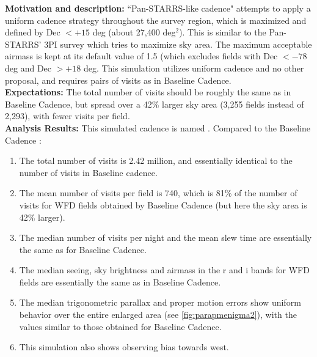 

{\bf Motivation and description:} ``Pan-STARRS-like cadence" attempts to apply a
uniform cadence strategy throughout the survey region, which is maximized and
defined by Dec $< +15$ deg (about 27,400 deg$^2$). This is similar to the Pan-
STARRS' 3PI survey which tries to maximize sky area. The maximum acceptable
airmass is kept at its default value of 1.5 (which excludes fields with Dec 
$<-78$ deg and Dec $> +18$ deg. This simulation utilizes uniform cadence and no
other proposal, and requires pairs of visits as in Baseline Cadence. \\

{\bf Expectations:} The total number of visits should be roughly the
same as in Baseline Cadence, but spread over a 42\% larger sky area
(3,255 fields instead of 2,293), with fewer visits per field. \\

{\bf Analysis Results:}  This simulated cadence is named .
Compared to the Baseline Cadence :
\begin{enumerate}
\item The total number of visits is 2.42 million, and essentially identical to the
number of visits in Baseline cadence.
\item
The mean number of visits per field is 740, which is 81\% of the number of visits %
for WFD fields obtained by Baseline Cadence (but here the sky area is 42\% larger).
\item The median number of visits per night and the mean slew time are
  essentially the same as for Baseline Cadence.
\item The median seeing, sky brightness and airmass in the r and i
  bands for WFD fields are essentially the same as in Baseline
  Cadence.
\item The median trigonometric parallax and proper motion errors show
  uniform behavior over the entire enlarged area (see
  \autoref{fig:parapmenigma2}), with the values similar to those
  obtained for Baseline Cadence.
\item This simulation also shows observing bias towards west.
\end{enumerate}


